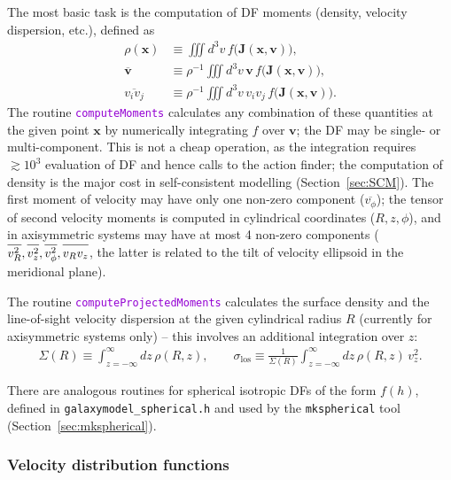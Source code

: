 \documentclass[12pt]{article}
\newcommand{\ttt}[1]{\textcolor{darkviolet}{\texttt{#1}}}
\newcommand{\bv}{\boldsymbol{v}}
\newcommand{\bx}{\boldsymbol{x}}
\newcommand{\bJ}{\boldsymbol{J}}
\begin{document}
The most basic task is the computation of DF moments (density, velocity dispersion, etc.), defined as
\begin{align*}
\rho(\bx) &\equiv \iiint d^3v\, f\big(\bJ(\bx,\bv)\big), \\
\overline{\bv} &\equiv \rho^{-1} \iiint d^3v \,\bv\, f\big(\bJ(\bx,\bv)\big), \\
\overline{v_i v_j} &\equiv \rho^{-1} \iiint d^3v \,v_i v_j\, f\big(\bJ(\bx,\bv)\big).
\end{align*}
The routine \ttt{computeMoments} calculates any combination of these quantities at the given point $\bx$ by numerically integrating $f$ over $\bv$; the DF may be single- or multi-component. 
This is not a cheap operation, as the integration requires $\gtrsim 10^3$ evaluation of DF and hence calls to the action finder; the computation of density is the major cost in self-consistent modelling (Section~\ref{sec:SCM}). The first moment of velocity may have only one non-zero component ($\overline{v_\phi}$); the tensor of second velocity moments is computed in cylindrical coordinates ($R,z,\phi$), and in axisymmetric systems may have at most 4 non-zero components ($\overline{\strut v_R^2}, \overline{\strut v_z^2}, \overline{\strut v_\phi^2}, \overline{\strut v_R v_z}$, the latter is related to the tilt of velocity ellipsoid in the meridional plane).

The routine \ttt{computeProjectedMoments} calculates the surface density and the line-of-sight velocity dispersion at the given cylindrical radius $R$ (currently for axisymmetric systems only) -- this involves an additional integration over $z$:
\begin{align*}
\Sigma(R) \equiv \int_{z=-\infty}^\infty dz\, \rho(R,z), \qquad
\sigma_\mathrm{los} \equiv \frac{1}{\Sigma(R)} \int_{z=-\infty}^\infty dz\, \rho(R,z)\, v_z^2 .
\end{align*}

There are analogous routines for spherical isotropic DFs of the form $f(h)$, defined in \texttt{galaxymodel_spherical.h} and used by the \texttt{mkspherical} tool (Section~\ref{sec:mkspherical}).

\subsubsection{Velocity distribution functions}  \label{sec:VDF}
\end{document}
